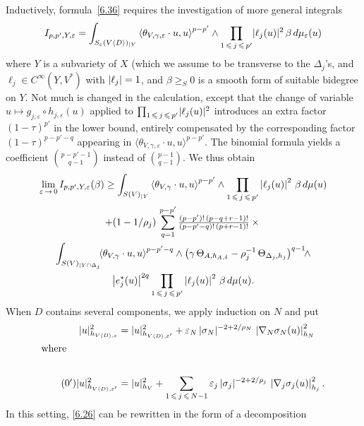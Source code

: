 \documentclass[AHL,Unicode,longabstracts,published]{cedram}
\DeclarePairedDelimiter{\abs}{\lvert}{\rvert}
\let\leq\leqslant
\let\geq\geqslant
\begin{document}
Inductively, formula~\eqref{6.36} requires the investigation of more general integrals
\[
I_{p,p',Y,\varepsilon} =
\int_{S_\varepsilon(V\langle D\rangle)_{|Y}}
\left\langle\theta_{V,\gamma,\varepsilon}\cdot u,u\right\rangle^{p-p'}\wedge
\prod_{1\,\leq\,j\,\leq\,p'}\abs{\ell_j(u)}^2\,\beta\,d\mu_\varepsilon(u)
\]
where $Y$ is a subvariety of $X$ (which we assume to be transverse to the $\Delta_j$'s, and $\ell_j\in C^\infty(Y,V^*)$ with $\abs{\ell_j}=1$, and $\beta\geq_S 0$ is a smooth form of suitable bidegree on $Y$. Not much is changed in the calculation, except that the change of variable $u\mapsto g_{j,\varepsilon}\circ h_{j,\varepsilon}(u)$ applied to $\prod_{1\,\leq\,j\,\leq\,p'}\abs{\ell_j(u)}^2$ introduces an extra factor $(1-\tau)^{p'}$ in the lower bound, entirely compensated by the corresponding factor $(1-\tau)^{p-p'-q}$ appearing in $\langle\theta_{V,\gamma,\varepsilon}\cdot u,u\rangle^{p-p'}$. The binomial formula yields a coefficient $\binom{p-p'-1}{ q-1}$ instead of
$\binom{p-1}{ q-1}$. We thus obtain
\begin{multline}
\lim_{\varepsilon\,\to\,0}I_{p,p',Y,\varepsilon}(\beta)\ge
\int_{S(V)_{|Y}}\left\langle\theta_{V,\gamma}\cdot u,u\right\rangle^{p-p'}\wedge
\prod_{1\,\leq\,j\,\leq\,p'}\left|\ell_j(u)\right|^2\,\beta\,d\mu(u)\\
+(1-1/\rho_j)\,\sum_{q=1}^{p-p'}\tfrac{(p-p')!\,(p-q+r-1)!}{ (p-p'-q)!\,(p+r-1)!}\times{}\\
\int_{S(V)_{|Y\cap\Delta_j}}\kern-4pt
\left\langle\theta_{V,\gamma}\cdot u,u\right\rangle^{p-p'-q}\wedge
\big(\gamma\,\Theta_{A,h_{A,\delta}}-\rho_j^{-1}\,
\Theta_{\Delta_j,h_j}\big)^{q-1}\!
\wedge
\\
\left|e_j^*(u)\right|^{2q}\prod_{1\,\leq\,j\,\leq\,p'}\left|\ell_j(u)\right|^2\,
\beta\,d\mu(u).
\end{multline}
When $D$ contains several components, we apply induction on $N$ and put
\begin{align}
\abs{u}_{h_{V\langle D\rangle,\varepsilon}}^2&=
\abs{u}_{h_{V\langle D\rangle,\varepsilon'}}^2 +\varepsilon_N\,\abs{\sigma_N}^{-2+2/\rho_N}\,
\left|\nabla_N\sigma_N(u)\right|^2_{h_N}\\
\intertext{where}
\\ \tag{\theequation\ensuremath{'}}
\abs{u}_{h_{V\langle D\rangle,\varepsilon'}}^2&=
\abs{u}^2_{h_V}+\sum_{1\,\leq\,j\,\leq\,N-1}\varepsilon_j\,\abs{\sigma_j}^{-2+2/\rho_j}\,
\left|\nabla_j\sigma_j(u)\right|^2_{h_j}.
\end{align}
In this setting, \eqref{6.26} can be rewritten in the form of a decomposition
\end{document}
